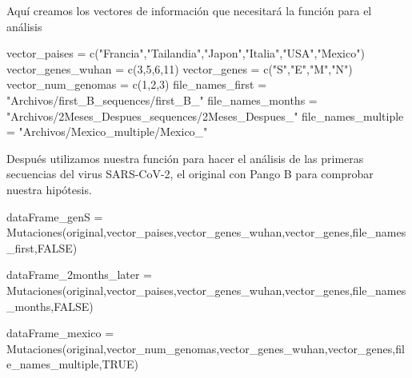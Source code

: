 \documentclass[
  12pt,
]{article}
\newenvironment{Shaded}{\begin{snugshade}}{\end{snugshade}}
\newcommand{\ConstantTok}[1]{\textcolor[rgb]{0.00,0.00,0.00}{#1}}
\newcommand{\DecValTok}[1]{\textcolor[rgb]{0.00,0.00,0.81}{#1}}
\newcommand{\FunctionTok}[1]{\textcolor[rgb]{0.00,0.00,0.00}{#1}}
\newcommand{\NormalTok}[1]{#1}
\newcommand{\OtherTok}[1]{\textcolor[rgb]{0.56,0.35,0.01}{#1}}
\newcommand{\StringTok}[1]{\textcolor[rgb]{0.31,0.60,0.02}{#1}}
\begin{document}
Aquí creamos los vectores de información que necesitará la función para
el análisis

\begin{Shaded}
\begin{Highlighting}[]
\NormalTok{vector\_paises }\OtherTok{=} \FunctionTok{c}\NormalTok{(}\StringTok{"Francia"}\NormalTok{,}\StringTok{"Tailandia"}\NormalTok{,}\StringTok{"Japon"}\NormalTok{,}\StringTok{"Italia"}\NormalTok{,}\StringTok{"USA"}\NormalTok{,}\StringTok{"Mexico"}\NormalTok{)}
\NormalTok{vector\_genes\_wuhan }\OtherTok{=} \FunctionTok{c}\NormalTok{(}\DecValTok{3}\NormalTok{,}\DecValTok{5}\NormalTok{,}\DecValTok{6}\NormalTok{,}\DecValTok{11}\NormalTok{)}
\NormalTok{vector\_genes }\OtherTok{=} \FunctionTok{c}\NormalTok{(}\StringTok{"S"}\NormalTok{,}\StringTok{"E"}\NormalTok{,}\StringTok{"M"}\NormalTok{,}\StringTok{"N"}\NormalTok{)}
\NormalTok{vector\_num\_genomas }\OtherTok{=} \FunctionTok{c}\NormalTok{(}\DecValTok{1}\NormalTok{,}\DecValTok{2}\NormalTok{,}\DecValTok{3}\NormalTok{)}
\NormalTok{file\_names\_first }\OtherTok{=} \StringTok{"Archivos/first\_B\_sequences/first\_B\_"}
\NormalTok{file\_names\_months }\OtherTok{=} \StringTok{"Archivos/2Meses\_Despues\_sequences/2Meses\_Despues\_"}
\NormalTok{file\_names\_multiple }\OtherTok{=} \StringTok{"Archivos/Mexico\_multiple/Mexico\_"}
\end{Highlighting}
\end{Shaded}

Después utilizamos nuestra función para hacer el análisis de las
primeras secuencias del virus SARS-CoV-2, el original con Pango B para
comprobar nuestra hipótesis.

\begin{Shaded}
\begin{Highlighting}[]
\NormalTok{dataFrame\_genS }\OtherTok{=} \FunctionTok{Mutaciones}\NormalTok{(original,vector\_paises,vector\_genes\_wuhan,vector\_genes,file\_names\_first,}\ConstantTok{FALSE}\NormalTok{)}

\NormalTok{dataFrame\_2months\_later }\OtherTok{=} \FunctionTok{Mutaciones}\NormalTok{(original,vector\_paises,vector\_genes\_wuhan,vector\_genes,file\_names\_months,}\ConstantTok{FALSE}\NormalTok{)}

\NormalTok{dataFrame\_mexico }\OtherTok{=} \FunctionTok{Mutaciones}\NormalTok{(original,vector\_num\_genomas,vector\_genes\_wuhan,vector\_genes,file\_names\_multiple,}\ConstantTok{TRUE}\NormalTok{)}
\end{Highlighting}
\end{Shaded}
\end{document}
